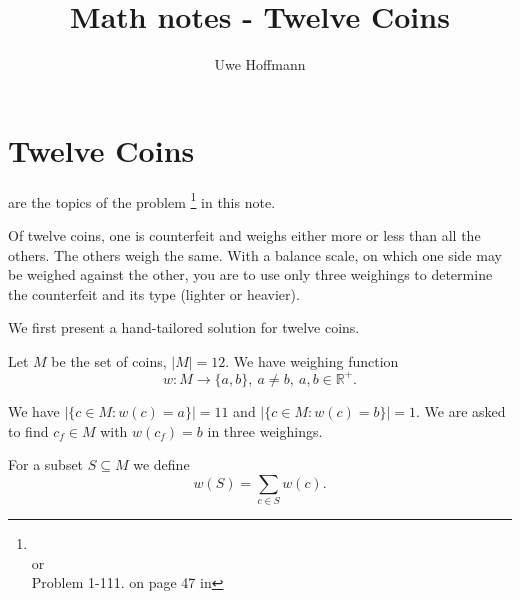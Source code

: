 

\title{Math notes - Twelve Coins}
\author{Uwe Hoffmann}



\setcounter{chapter}{1}
\section*{Twelve Coins}

 are the topics of the problem \footnote{ \\ or \\ Problem 1-111. on page 47 in } in this note.

\vspace{10 mm}
\begin{problem}
Of twelve coins, one is counterfeit and weighs either more or less than all the others. The others weigh the same. With a balance scale, on which one side may be weighed against the other, you are to use only three weighings to determine the counterfeit and its type (lighter or heavier). 
\end{problem}

We first present a hand-tailored solution for twelve coins.

Let $M$ be the set of coins, $|M|=12$. We have weighing function
\[
 	w : M \rightarrow \{a, b\},\  a \neq b,\ a, b \in \mathbb{R}^+.
\]

\noindent We have $| \{ c \in M : w(c) = a \} | = 11$ and  $| \{ c \in M : w(c) = b \} | = 1$. We are asked to find 
$c_f \in M$ with $w(c_f) = b$ in three weighings.\bigskip

\noindent For a subset $S \subseteq M$ we define
\[
	w(S) = \sum_{c \in S} w(c).
\]

